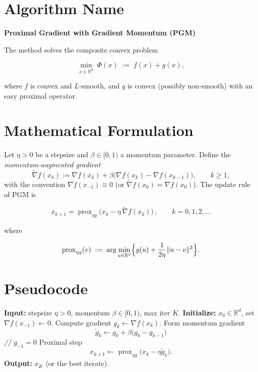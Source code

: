 \documentclass{article}
\newcommand{\prox}{\operatorname{prox}}
\begin{document}
\section*{Algorithm Name}
\textbf{Proximal Gradient with Gradient Momentum (PGM)}  

The method solves the composite convex problem  

\[
\min_{x\in\mathbb R^{d}} \; \Phi(x)\;:=\;f(x)+g(x),
\]

where $f$ is convex and $L$‑smooth, and $g$ is convex (possibly non‑smooth) with an easy proximal operator.

\section*{Mathematical Formulation}
Let $\eta>0$ be a stepsize and $\beta\in[0,1)$ a momentum parameter.  
Define the \emph{momentum‑augmented gradient}
\[
\tilde\nabla f(x_k):= \nabla f(x_k)+\beta\bigl(\nabla f(x_k)-\nabla f(x_{k-1})\bigr),\qquad k\ge 1,
\]
with the convention $\nabla f(x_{-1})\equiv 0$ (or $\tilde\nabla f(x_0)=\nabla f(x_0)$).  
The update rule of PGM is  

\[
\boxed{\,x_{k+1}= \prox_{\eta g}\!\bigl(x_k-\eta\,\tilde\nabla f(x_k)\bigr)\,,\qquad k=0,1,2,\dots\, } \tag{1}
\]

where  

\[
\prox_{\eta g}(v)\;:=\;\arg\min_{u\in\mathbb R^{d}}\Bigl\{ g(u)+\frac{1}{2\eta}\|u-v\|^{2}\Bigr\}.
\]

\section*{Pseudocode}
\begin{algorithm}[H]
\caption{PGM: Proximal Gradient with Gradient Momentum}
\begin{algorithmic}[1]
\STATE \textbf{Input:} stepsize $\eta>0$, momentum $\beta\in[0,1)$, max iter $K$.
\STATE \textbf{Initialize:} $x_0\in\mathbb R^{d}$, set $\nabla f(x_{-1})\gets 0$.
    \STATE Compute gradient $g_k\gets\nabla f(x_k)$.
    \STATE Form momentum gradient 
    \[
    \tilde g_k \gets g_k+\beta\bigl(g_k-g_{k-1}\bigr)
    \]   \hfill\textit{// $g_{-1}=0$}
    \STATE Proximal step 
    \[
    x_{k+1}\gets \prox_{\eta g}\bigl(x_k-\eta \tilde g_k\bigr).
    \]
\ENDFOR
\STATE \textbf{Output:} $x_K$ (or the best iterate).
\end{algorithmic}
\end{algorithm}
\end{document}
